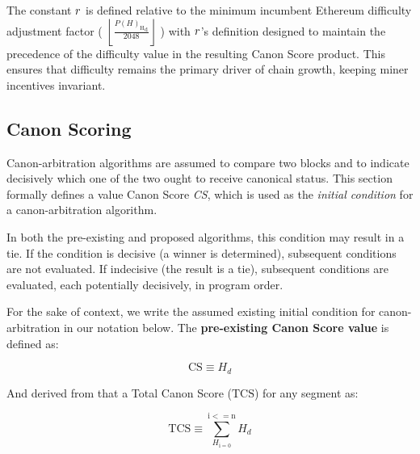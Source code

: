 \documentclass[11pt]{article}
\theoremstyle{plain}
\begin{document}
The constant $r$ is defined relative to
the minimum incumbent Ethereum difficulty adjustment factor (
    $\left\lfloor\frac{{P(H)_{\mathrm{H}}}_{\mathrm{d}}}{2048}\right\rfloor$
)
with $r$'s definition designed
to maintain the precedence of the difficulty value in the resulting Canon Score product.
This ensures that difficulty remains the primary driver of chain growth,
keeping miner incentives invariant.


\subsection{\small{Canon Scoring}}

Canon-arbitration algorithms are assumed to compare two blocks and to
indicate decisively which one of the two ought to receive canonical status.
This section formally defines a value Canon Score \textit{CS}, which is used as
the \textit{initial condition} for a canon-arbitration algorithm.

In both the pre-existing and proposed algorithms, this condition may result in a tie.
If the condition is decisive (a winner is determined),
subsequent conditions are not evaluated.
If indecisive (the result is a tie), subsequent conditions are evaluated,
each potentially decisively, in program order.

For the sake of context, we write the assumed existing initial condition for
canon-arbitration in our notation below. The \textbf{pre-existing Canon Score value} is defined as:

\begin{equation}
\mathrm{CS} \equiv H_d
\end{equation}

And derived from that a Total Canon Score ($\mathrm{TCS}$) for any segment as:

\begin{equation}
\mathrm{TCS} \equiv \sum_{H_\mathrm{i = 0}}^{\mathrm{i <= n}} H_d
\end{equation}
\end{document}
